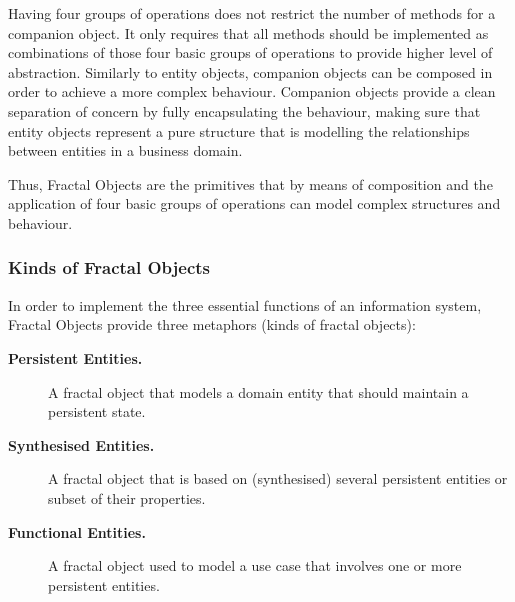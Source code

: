   Having four groups of operations does not restrict the number of methods for a companion object.
  It only requires that all methods should be implemented as combinations of those four basic groups of operations to provide higher level of abstraction.
  Similarly to entity objects, companion objects can be composed in order to achieve a more complex behaviour.
  Companion objects provide a clean separation of concern by fully encapsulating the behaviour, making sure that entity objects represent a pure structure that is modelling the relationships between entities in a business domain.

  Thus, Fractal Objects are the primitives that by means of composition and the application of four basic groups of operations can model complex structures and behaviour.
  
  \subsubsection{Kinds of Fractal Objects}

  In order to implement the three essential functions of an information system, Fractal Objects provide three metaphors (kinds of fractal objects):
  \begin{description}
    \item[\textbf{Persistent Entities.}] A fractal object that models a domain entity that should maintain a persistent state.
    \item[\textbf{Synthesised Entities.}] A fractal object that is based on (synthesised) several persistent entities or subset of their properties.
    \item[\textbf{Functional Entities.}] A fractal object used to model a use case that involves one or more persistent entities.
  \end{description}

